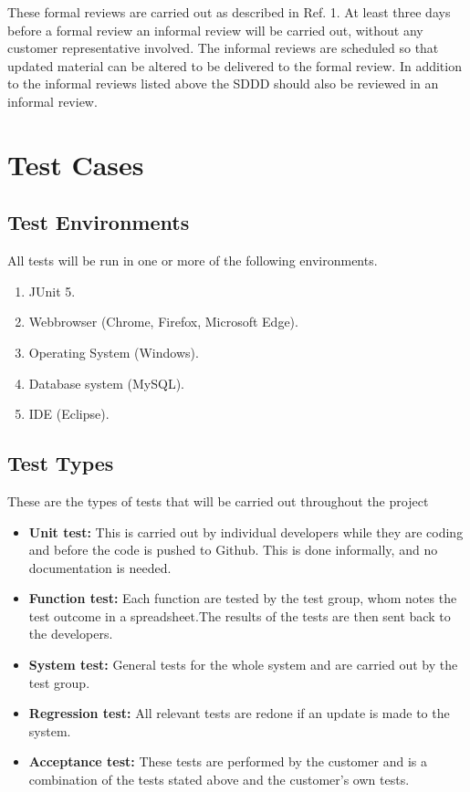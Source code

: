 \documentclass{article}
\begin{document}
\noindent
These formal reviews are carried out as described in Ref. 1. At least three days before a formal review an informal review will be carried out, without any customer representative involved. The informal reviews are scheduled so that updated material can be altered to be delivered to the formal review. In addition to the informal reviews listed above the SDDD should also be reviewed in an informal review. 

\section{Test Cases}
	\subsection{Test Environments}
	All tests will be run in one or more of the following environments. 
		\begin{enumerate}
			\item JUnit 5.

			\item Webbrowser (Chrome, Firefox, Microsoft Edge).

			\item Operating System (Windows).

			\item Database system (MySQL).

			\item IDE (Eclipse).	
		\end{enumerate}
		
		\subsection{Test Types}
		
These are the types of tests that will be carried out throughout the project


\begin{itemize}
  \item \textbf{Unit test:} This is carried out by individual developers while they are coding and before the code is pushed to Github. This is done informally, and no documentation is needed.
  \item \textbf{Function test:} Each function are tested by the test group, whom notes the test outcome in a spreadsheet.The results of the tests are then sent back to the developers.
   \item \textbf{System test:} General tests for the whole system and are carried out by the test group.
      \item \textbf{Regression test:} All relevant tests are redone if an update is made to the system.
         \item \textbf{Acceptance test:} These tests are performed by the customer and is a combination of the tests stated above and the customer's own tests.
\end{itemize}
\end{document}
